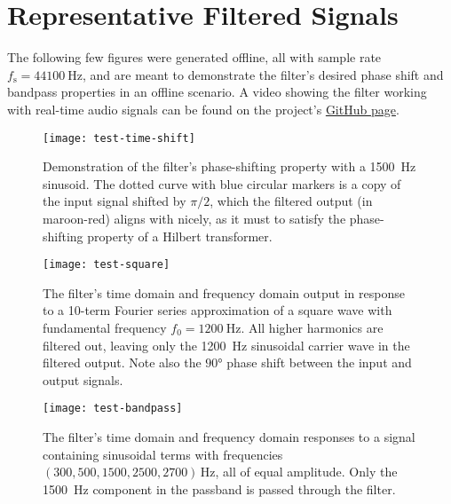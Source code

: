 \section{Representative Filtered Signals}
The following few figures were generated offline, all with sample rate $ f_{\mathrm{s}} = \SI{44100}{\hertz} $, and are meant to demonstrate the filter's desired phase shift and bandpass properties in an offline scenario.
A video showing the filter working with real-time audio signals can be found on the project's \href{https://github.com/ejmastnak/hilbert-bandpass}{GitHub page}.

\begin{figure}[htb!]
	\centering
	\texttt{[image: test-time-shift]}
    \vspace{-3ex}
	\caption{Demonstration of the filter's phase-shifting property with a \SI{1500}{\hertz} sinusoid.
    The dotted curve with blue circular markers is a copy of the input signal shifted by $ \pi/2 $, which the filtered output (in maroon-red) aligns with nicely, as it must to satisfy the phase-shifting property of a Hilbert transformer.}
	\label{fig:phase}
\end{figure}

\begin{figure}[htb!]
	\centering
	\texttt{[image: test-square]}
    \vspace{-5ex}
	\caption{The filter's time domain and frequency domain output in response to a 10-term Fourier series approximation of a square wave with fundamental frequency $ f_{0} = \SI{1200}{\hertz} $.
    All higher harmonics are filtered out, leaving only the \SI{1200}{\hertz} sinusoidal carrier wave in the filtered output.
    Note also the $ \ang{90} $ phase shift between the input and output signals.}
	\label{fig:square}
\end{figure}

\begin{figure}[htb!]
	\centering
	\texttt{[image: test-bandpass]}
    \vspace{-5ex}
	\caption{The filter's time domain and frequency domain responses to a signal containing sinusoidal terms with frequencies $ (300, 500, 1500, 2500, 2700) \, \si{\hertz} $, all of equal amplitude.
    Only the \SI{1500}{\hertz} component in the passband is passed through the filter.}
	\label{fig:bandpass}
\end{figure}

\clearpage
\printbibliography


